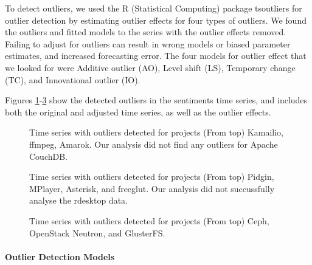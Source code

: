\documentclass[12pt]{report}
\begin{document}
To detect outliers, we used the R (Statistical Computing) \cite{R} package tsoutliers \cite{Lopez} for outlier detection by estimating outlier effects for four types of outliers. We found the outliers and fitted models to the series with the outlier effects removed. Failing to adjust for outliers can result in wrong models or biased parameter estimates, and increased forecasting error. The four models for outlier effect that we looked for were Additive outlier (AO), Level shift (LS), Temporary change (TC), and Innovational outlier (IO).

Figures \ref{figureOutliers_1to4}-\ref{figureOutliers_9to12} show the detected outliers in the sentiments time series, and includes both the original and adjusted time series, as well as the outlier effects.

\begin{figure}[!htbp]
\centering
{}
\caption{Time series with outliers detected for projects (From top) Kamailio, ffmpeg, Amarok. Our analysis did not find any outliers for Apache CouchDB.}
\label{figureOutliers_1to4}
\end{figure}

\begin{figure}[!htbp]
\centering
{}

\caption{Time series with outliers detected for projects (From top) Pidgin, MPlayer, Asterisk, and freeglut. Our analysis did not succussfully analyse the rdesktop data.}
\label{figureOutliers_5to8}
\end{figure}


\begin{figure}[!htbp]
\centering

\caption{Time series with outliers detected for projects (From top) Ceph, OpenStack Neutron, and GlusterFS.}
\label{figureOutliers_9to12}
\end{figure}

\paragraph{Outlier Detection Models}
\end{document}
